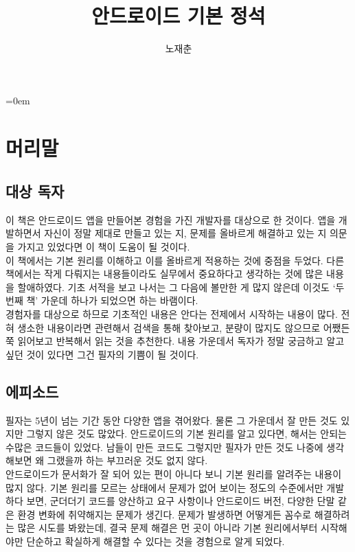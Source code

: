 \documentclass[a4paper,hidelinks,10pt,openany]{book} %
\title{안드로이드 기본 정석}
\author{노재춘}
\begin{document}

\maketitle
\parindent=0em

\chapter*{머리말}
\section*{대상 독자}
이 책은 안드로이드 앱을 만들어본 경험을 가진 개발자를 대상으로 한 것이다. 
앱을 개발하면서 자신이 정말 제대로 만들고 있는 지, 문제를 올바르게 해결하고 있는 지 의문을 가지고 있었다면 이 책이 도움이 될 것이다.\\

이 책에서는 기본 원리를 이해하고 이를 올바르게 적용하는 것에 중점을 두었다. 
다른 책에서는 작게 다뤄지는 내용들이라도 실무에서 중요하다고 생각하는 것에 많은 내용을 할애하였다.
기초 서적을 보고 나서는 그 다음에 볼만한 게 많지 않은데 이것도 `두 번째 책' 가운데 하나가 되었으면 하는 바램이다.\\

경험자를 대상으로 하므로 기초적인 내용은 안다는 전제에서 시작하는 내용이 많다. 
전혀 생소한 내용이라면 관련해서 검색을 통해 찾아보고, 분량이 많지도 않으므로 어쨌든 쭉 읽어보고 반복해서 읽는 것을 추천한다. 
내용 가운데서 독자가 정말 궁금하고 알고 싶던 것이 있다면 그건 필자의 기쁨이 될 것이다.

\section*{에피소드}
필자는 5년이 넘는 기간 동안 다양한 앱을 겪어왔다. 물론 그 가운데서 잘 만든 것도 있지만 그렇지 않은 것도 많았다. 
안드로이드의 기본 원리를 알고 있다면, 해서는 안되는 수많은 코드들이 있었다.
남들이 만든 코드도 그렇지만 필자가 만든 것도 나중에 생각해보면 왜 그랬을까 하는 부끄러운 것도 없지 않다.\\

안드로이드가 문서화가 잘 되어 있는 편이 아니다 보니 기본 원리를 알려주는 내용이 많지 않다. 
기본 원리를 모르는 상태에서 문제가 없어 보이는 정도의 수준에서만 개발하다 보면, 군더더기 코드를 양산하고 요구 사항이나 안드로이드 버전, 다양한 단말 같은 환경 변화에 취약해지는 문제가 생긴다.
문제가 발생하면 어떻게든 꼼수로 해결하려는 많은 시도를 봐왔는데, 결국 문제 해결은 먼 곳이 아니라 기본 원리에서부터 시작해야만
단순하고 확실하게 해결할 수 있다는 것을 경험으로 알게 되었다.\\
\end{document}
